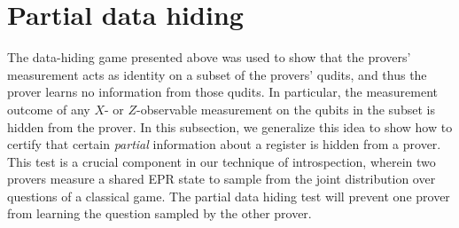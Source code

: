 \section{Partial data hiding}\label{sec:rotated-data-hiding}

The data-hiding game presented above was used to show that the
provers' measurement acts as identity on a subset of the provers'
qudits, and thus the prover learns no information from those
qudits. In particular, the measurement outcome of any $X$- or
$Z$-observable measurement on the qubits in the subset is hidden from
the prover. In this subsection, we generalize this idea to show how
to certify that certain \emph{partial} information about a register is hidden
from a prover. This test is a crucial component in our technique of
introspection, wherein two provers measure a shared EPR state to
sample from the joint distribution over questions of a classical
game. The partial data hiding test will prevent one prover from
learning the question sampled by the other prover.

